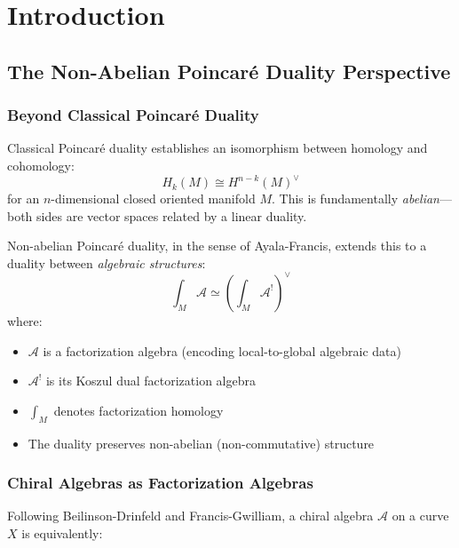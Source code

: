 \chapter{Introduction}

\section{The Non-Abelian Poincaré Duality Perspective}
\label{sec:nonabelian-poincare-intro}

\subsection{Beyond Classical Poincaré Duality}

Classical Poincaré duality establishes an isomorphism between homology and cohomology:
\begin{equation}
H_k(M) \cong H^{n-k}(M)^\vee
\end{equation}
for an $n$-dimensional closed oriented manifold $M$. This is fundamentally \emph{abelian}—both sides are vector spaces related by a linear duality.

\begin{principle}
\label{prin:nonabelian-poincare}
Non-abelian Poincaré duality, in the sense of Ayala-Francis, extends this to a duality between \emph{algebraic structures}:
\begin{equation}
\int_M \mathcal{A} \simeq \left(\int_M \mathcal{A}^!\right)^\vee
\end{equation}
where:
\begin{itemize}
\item $\mathcal{A}$ is a factorization algebra (encoding local-to-global algebraic data)
\item $\mathcal{A}^!$ is its Koszul dual factorization algebra
\item $\int_M$ denotes factorization homology
\item The duality preserves non-abelian (non-commutative) structure
\end{itemize}
\end{principle}

\subsection{Chiral Algebras as Factorization Algebras}

Following Beilinson-Drinfeld and Francis-Gwilliam, a chiral algebra $\mathcal{A}$ on a curve $X$ is equivalently:

